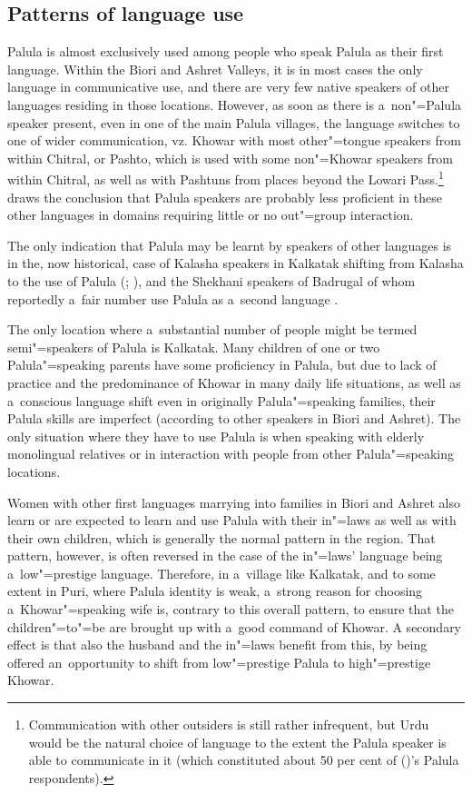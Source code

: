 \subsection{Patterns of language use}
\label{subsec:1-3-4}

Palula is almost exclusively used among people who speak Palula as their first language. Within the Biori and Ashret Valleys, it is in most cases the only language in communicative use, and there are very few native speakers of other languages residing in those locations. However, as soon as there is a~non"=Palula speaker present, even in one of the main Palula villages, the language switches to one of wider communication, vz. Khowar with most other"=tongue speakers from within Chitral, or Pashto, which is used with some non"=Khowar speakers from within Chitral, as well as with Pashtuns from places beyond the Lowari Pass.\footnote{Communication with other outsiders is still rather infrequent, but Urdu would be the natural choice of language to the extent the Palula speaker is able to communicate in it (which constituted about 50 per cent of \citeauthor{decker1992a} (\citeyear{decker1992a})'s Palula respondents).} \citet{decker1992a} draws the conclusion that Palula speakers are probably less proficient in these other languages in domains requiring little or no out"=group interaction. 


The only indication that Palula may be learnt by speakers of other languages is in the, now historical, case of Kalasha speakers in Kalkatak shifting from Kalasha to the use of Palula (\citealt[55, 79]{decker1992b}; \citealt[5]{akhunzadaliljegren2009}), and the Shekhani speakers of Badrugal of whom reportedly a~fair number use Palula as a~second language \citep[59]{decker1992b}. 


The only location where a~substantial number of people might be termed semi"=speakers of Palula is Kalkatak. Many children of one or two Palula"=speaking parents have some proficiency in Palula, but due to lack of practice and the predominance of Khowar in many daily life situations, as well as a~conscious language shift even in originally Palula"=speaking families, their Palula skills are imperfect (according to other speakers in Biori and Ashret). The only situation where they have to use Palula is when speaking with elderly monolingual relatives or in interaction with people from other Palula"=speaking locations.


Women with other first languages marrying into families in Biori and Ashret also learn or are expected to learn and use Palula with their in"=laws as well as with their own children, which is generally the normal pattern in the region. That pattern, however, is often reversed in the case of the in"=laws' language being a~low"=prestige language. Therefore, in a~village like Kalkatak, and to some extent in Puri, where Palula identity is weak, a~strong reason for choosing a~Khowar"=speaking wife is, contrary to this overall pattern, to ensure that the children"=to"=be are brought up with a~good command of Khowar. A secondary effect is that also the husband and the in"=laws benefit from this, by being offered an~opportunity to shift from low"=prestige Palula to high"=prestige Khowar.


